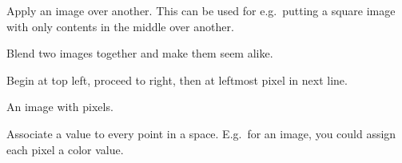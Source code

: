 \begin{definition}
    Apply an image over another. This can be used for e.g.\ putting a square image
    with only contents in the middle over another.
\end{definition}



\begin{definition}
    Blend two images together and make them seem alike.
\end{definition}

\begin{definition}
    Begin at top left, proceed to right, then at leftmost pixel in next line.
\end{definition}

\begin{definition}
    An image with pixels.
\end{definition}

\begin{definition}\label{scalarfield}
    Associate a value to every point in a space. E.g.\ for an image, you
    could assign each pixel a color value.
\end{definition}

